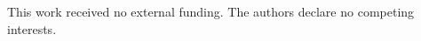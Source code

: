 \documentclass[letterpaper]{article} %
\begin{document}
\clearpage
\begin{ack}
This work received no external funding.  The authors declare no competing
interests.
\end{ack}



\end{document}
